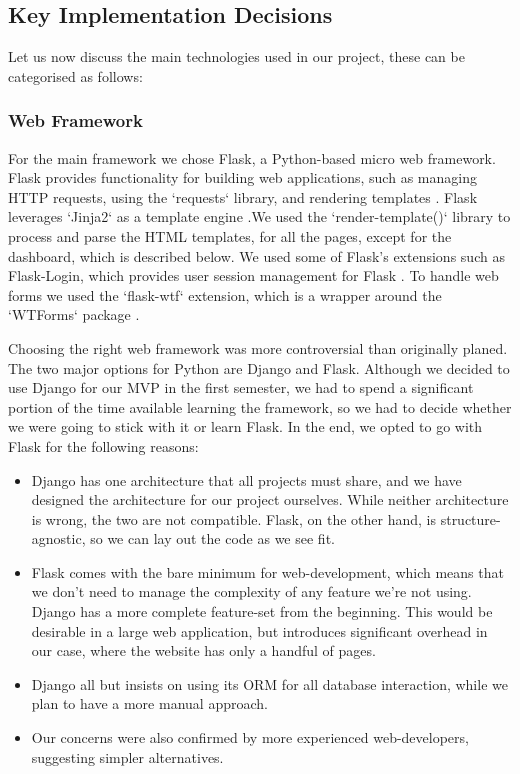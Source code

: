 \subsection{Key Implementation Decisions}

Let us now discuss the main technologies used in our project, these can be categorised as follows:
\subsubsection{Web Framework}

\label{Web Framework}
For the main framework we chose Flask, a Python-based micro web framework. Flask provides functionality for building web applications, such as managing HTTP requests, using the `requests` library, and rendering templates \cite{smyth_2018}. Flask leverages `Jinja2` as a template engine \cite{templates_2010}.We used the `render-template()` library to process and parse the HTML templates, for all the pages, except for the dashboard, which is described below. We used some of Flask's extensions such as Flask-Login, which provides user session management for Flask \cite{flask-login}. To handle web forms we used the `flask-wtf` extension, which is a wrapper around the `WTForms` package \cite{wtforms-documentation}. 

Choosing the right web framework was more controversial than originally planed. The two major options for Python are Django and Flask. Although we decided to use Django for our MVP in the first semester, we had to spend a significant portion of the time available learning the framework, so we had to decide whether we were going to stick with it or learn Flask. In the end, we opted to go with Flask for the following reasons:

\begin{itemize}
    \item Django has one architecture that all projects must share, and we have designed the architecture for our project ourselves. While neither architecture is wrong, the two are not compatible. Flask, on the other hand, is structure-agnostic, so we can lay out the code as we see fit.

    \item Flask comes with the bare minimum for web-development, which means that we don't need to manage the complexity of any feature we're not using. Django has a more complete feature-set from the beginning. This would be desirable in a large web application, but introduces significant overhead in our case, where the website has only a handful of pages.

    \item Django all but insists on using its ORM for all database interaction, while we plan to have a more manual approach.

    \item Our concerns were also confirmed by more experienced web-developers, suggesting simpler alternatives.
\end{itemize}

